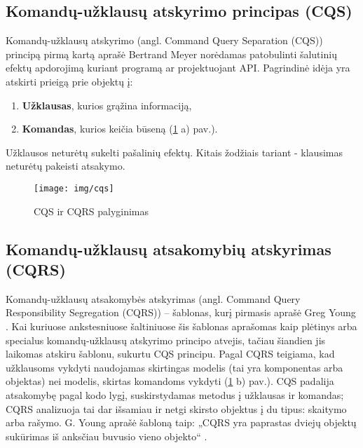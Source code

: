 \subsection{Komandų-užklausų atskyrimo principas (CQS)}

Komandų-užklausų atskyrimo (angl. Command Query Separation (CQS)) principą pirmą kartą aprašė Bertrand Meyer \cite{Meyer:1988:OSC:534929} norėdamas patobulinti šalutinių efektų apdorojimą kuriant programą ar projektuojant API. Pagrindinė idėja yra atskirti prieigą prie objektų į:

\begin{enumerate}

  \item \textbf{Užklausas}, kurios grąžina informaciją,

  \item \textbf{Komandas}, kurios keičia būseną (\ref{img:cqs} a) pav.).

\end{enumerate}

Užklausos neturėtų sukelti pašalinių efektų. Kitais žodžiais tariant - klausimas neturėtų pakeisti atsakymo.

\begin{figure}[H]
    \centering
    \texttt{[image: img/cqs]}
    \caption{CQS ir CQRS palyginimas}
    \label{img:cqs}
\end{figure}

\subsection{Komandų-užklausų atsakomybių atskyrimas (CQRS)}

Komandų-užklausų atsakomybės atskyrimas (angl. Command Query Responsibility Segregation (CQRS)) – šablonas, kurį pirmasis aprašė Greg Young \cite{Young:CQRS2013}. Kai kuriuose ankstesniuose šaltiniuose šis šablonas aprašomas kaip plėtinys arba specialus komandų-užklausų atskyrimo principo atvejis, tačiau šiandien jis laikomas atskiru šablonu, sukurtu CQS principu. Pagal CQRS teigiama, kad užklausoms vykdyti naudojamas skirtingas modelis (tai yra komponentas arba objektas) nei modelis, skirtas komandoms vykdyti (\ref{img:cqs} b) pav.). CQS padalija atsakomybę pagal kodo lygį, suskirstydamas metodus į užklausas ir komandas; CQRS analizuoja tai dar išsamiau ir netgi skirsto objektus į du tipus: skaitymo arba rašymo. G. Young aprašė šabloną taip: „CQRS yra paprastas dviejų objektų sukūrimas iš anksčiau buvusio vieno objekto“ \cite{Young:CQRS2010}.

